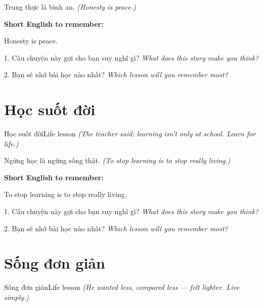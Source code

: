 \begin{baihoc}
Trung thực là bình an.
\textit{(Honesty is peace.)}
\end{baihoc}

\begin{ghinhoanh}
\textbf{Short English to remember:}

Honesty is peace.

\end{ghinhoanh}

\begin{tuhocnhanh}
1. Câu chuyện này gợi cho bạn suy nghĩ gì? \textit{What does this story make you think?}

2. Bạn sẽ nhớ bài học nào nhất? \textit{Which lesson will you remember most?}
\end{tuhocnhanh}
\ngancach


\section{Học suốt đời}
\begin{truyen}{Học suốt đời}{Life lesson}
\textit{(The teacher said: learning isn't only at school. Learn for life.)}
\end{truyen}

\begin{baihoc}
Ngừng học là ngừng sống thật.
\textit{(To stop learning is to stop really living.)}
\end{baihoc}

\begin{ghinhoanh}
\textbf{Short English to remember:}

To stop learning is to stop really living.

\end{ghinhoanh}

\begin{tuhocnhanh}
1. Câu chuyện này gợi cho bạn suy nghĩ gì? \textit{What does this story make you think?}

2. Bạn sẽ nhớ bài học nào nhất? \textit{Which lesson will you remember most?}
\end{tuhocnhanh}
\ngancach


\section{Sống đơn giản}
\begin{truyen}{Sống đơn giản}{Life lesson}
\textit{(He wanted less, compared less — felt lighter. Live simply.)}
\end{truyen}

